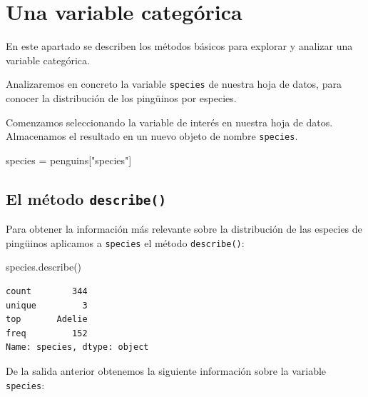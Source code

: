 \documentclass[
  a4paper,
  noprof,
  12pt,
  notoc,
  nosols,
  nobib]{mnye}
\newenvironment{Shaded}{\begin{snugshade}}{\end{snugshade}}
\newcommand{\NormalTok}[1]{\textcolor[rgb]{0.00,0.23,0.31}{#1}}
\newcommand{\OperatorTok}[1]{\textcolor[rgb]{0.37,0.37,0.37}{#1}}
\newcommand{\StringTok}[1]{\textcolor[rgb]{0.13,0.47,0.30}{#1}}
\theoremstyle{definition}
\theoremstyle{remark}
\begin{document}

\section{Una variable categórica}\label{una-variable-categuxf3rica}

En este apartado se describen los métodos básicos para explorar y
analizar una variable categórica.

Analizaremos en concreto la variable \texttt{species} de nuestra hoja de
datos, para conocer la distribución de los pingüinos por especies.

Comenzamos seleccionando la variable de interés en nuestra hoja de
datos. Almacenamos el resultado en un nuevo objeto de nombre
\texttt{species}.

\begin{Shaded}
\begin{Highlighting}[]
\NormalTok{species }\OperatorTok{=}\NormalTok{ penguins[}\StringTok{"species"}\NormalTok{]}
\end{Highlighting}
\end{Shaded}

\subsection{\texorpdfstring{El método
\texttt{describe()}}{El método describe()}}\label{sec-1categorical-describe}

Para obtener la información más relevante sobre la distribución de las
especies de pingüinos aplicamos a \texttt{species} el método
\texttt{describe()}:

\begin{Shaded}
\begin{Highlighting}[]
\NormalTok{species.describe()}
\end{Highlighting}
\end{Shaded}

\begin{verbatim}
count        344
unique         3
top       Adelie
freq         152
Name: species, dtype: object
\end{verbatim}

De la salida anterior obtenemos la siguiente información sobre la
variable \texttt{species}:
\end{document}
